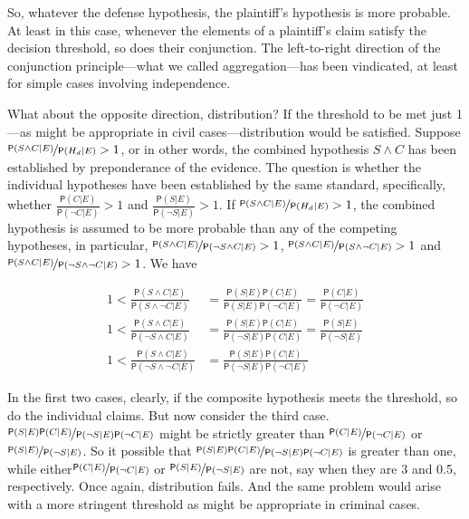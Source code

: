 \documentclass[
  10pt,
  dvipsnames,enabledeprecatedfontcommands]{scrartcl}
\newcommand{\n}{\neg}
\newcommand{\et}{\wedge}
\newcommand{\pr}[1]{\mathsf{P}(#1)}
\begin{document}
\noindent So, whatever the defense hypothesis, the plaintiff's
hypothesis is more probable. At least in this case, whenever the
elements of a plaintiff's claim satisfy the decision threshold, so does
their conjunction. The left-to-right direction of the conjunction
principle---what we called aggregation---has been vindicated, at least
for simple cases involving independence.

What about the opposite direction, distribution? If the threshold to be
met just 1---as might be appropriate in civil cases---distribution would
be satisfied. Suppose
\(\nicefrac{\pr{S\et C\vert E}}{\pr{H_d \vert E}}>1\), or in other
words, the combined hypothesis \(S \et C\) has been established by
preponderance of the evidence. The question is whether the individual
hypotheses have been established by the same standard, specifically,
whether \(\frac{\pr{C\vert E}}{\pr{\n C \vert E}} > 1\) and
\(\frac{\pr{S\vert E}}{\pr{\n S \vert E}} > 1\). If
\(\nicefrac{\pr{S\et C\vert E}}{\pr{H_d \vert E}}>1\), the combined
hypothesis is assumed to be more probable than any of the competing
hypotheses, in particular,
\(\nicefrac{\pr{S\et C\vert E}}{\pr{\neg S \et C \vert E}}>1\),
\(\nicefrac{\pr{S\et C\vert E}}{\pr{S \et \neg C \vert E}}>1\) and
\(\nicefrac{\pr{S\et C\vert E}}{\pr{\neg S \et \neg C \vert E}}>1\). We
have

\begin{align}\label{eq:cheng-multiplication-two}
1 < \frac{\pr{S\et C\vert E}}{\pr{S\et \n C\vert E}} & = \frac{\pr{S\vert E}\pr{C\vert E}}{\pr{S \vert E}\pr{\n C \vert E}}  =\frac{\pr{C\vert E}}{\pr{\n C \vert E}} \\
\nonumber
1 < \frac{\pr{S\et C\vert E}}{\pr{\n S\et C\vert E}} & = \frac{\pr{S\vert E}\pr{C\vert E}}{\pr{\n S \vert E}\pr{C\vert E}}  = \frac{\pr{S\vert E}}{\pr{\n S \vert E}}  \\
\nonumber
1 < \frac{\pr{S\et C\vert E}}{\pr{\n S\et \n C\vert E}} & = \frac{\pr{S\vert E}\pr{C\vert E}}{\pr{\n S \vert E}\pr{\n C \vert E}}   
\end{align}

In the first two cases, clearly, if the composite hypothesis meets the
threshold, so do the individual claims. But now consider the third case.
\(\nicefrac{\pr{S\vert E}\pr{C\vert E}}{\pr{\n S \vert E}\pr{\n C \vert E}}\)
might be strictly greater than
\(\nicefrac{\pr{C\vert E}}{\pr{\n C \vert E}}\) or
\(\nicefrac{\pr{S\vert E}}{\pr{\n S \vert E}}\). So it possible that
\(\nicefrac{\pr{S\vert E}\pr{C\vert E}}{\pr{\n S \vert E}\pr{\n C \vert E}}\)
is greater than one, while
either\(\nicefrac{\pr{C\vert E}}{\pr{\n C \vert E}}\) or
\(\nicefrac{\pr{S\vert E}}{\pr{\n S \vert E}}\) are not, say when they
are 3 and 0.5, respectively. Once again, distribution fails. And the
same problem would arise with a more stringent threshold as might be
appropriate in criminal cases.
\end{document}
